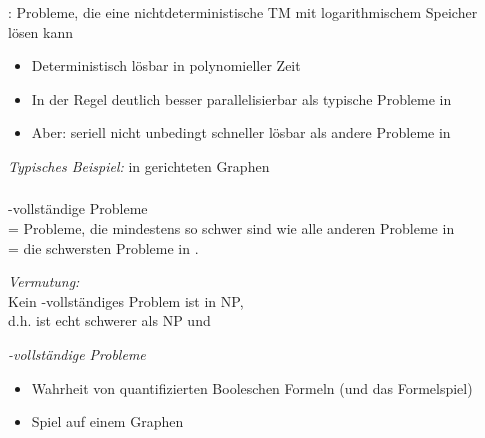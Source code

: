 \documentclass[aspectratio=1610,onlymath]{beamer}
\begin{document}
\maketitle

\begin{frame}\frametitle{}

\NLogSpace: Probleme, die eine nichtdeterministische TM mit logarithmischem Speicher lösen kann


\begin{itemize}
\item Deterministisch lösbar in polynomieller Zeit
\item In der Regel deutlich besser parallelisierbar als typische Probleme in \PTime
\item Aber: seriell nicht unbedingt schneller lösbar als andere Probleme in \PTime
\end{itemize}
\bigskip

\emph{Typisches Beispiel:}
 in gerichteten Graphen


\end{frame}

\begin{frame}\frametitle{\PSpace}

\PSpace-vollständige Probleme\\ = Probleme, die mindestens so schwer
sind wie alle anderen Probleme in \PSpace\\
= die schwersten Probleme in \PSpace.
\bigskip

\emph{Vermutung:}\\
Kein \PSpace-vollständiges Problem ist in NP,\\ d.h. \PSpace
ist echt schwerer als NP und 
\bigskip

\emph{\PSpace-vollständige Probleme}
\begin{itemize}
\item {} Wahrheit von quantifizierten Booleschen Formeln (und das Formelspiel)
\item {} Spiel auf einem Graphen
\end{itemize}


\end{frame}

\end{document}
